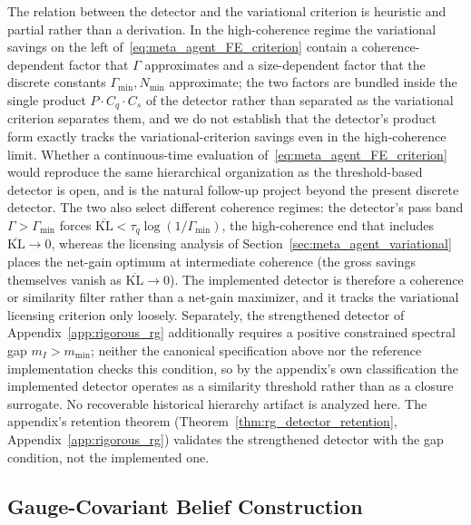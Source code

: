 \documentclass[11pt]{article}
\begin{document}
The relation between the detector and the variational criterion is heuristic and partial rather than a derivation. In the high-coherence regime the variational savings on the left of~\eqref{eq:meta_agent_FE_criterion} contain a coherence-dependent factor that $\Gamma$ approximates and a size-dependent factor that the discrete constants $\Gamma_{\min}, N_{\min}$ approximate; the two factors are bundled inside the single product $P \cdot C_q \cdot C_s$ of the detector rather than separated as the variational criterion separates them, and we do not establish that the detector's product form exactly tracks the variational-criterion savings even in the high-coherence limit. Whether a continuous-time evaluation of~\eqref{eq:meta_agent_FE_criterion} would reproduce the same hierarchical organization as the threshold-based detector is open, and is the natural follow-up project beyond the present discrete detector. The two also select different coherence regimes: the detector's pass band $\Gamma > \Gamma_{\min}$ forces $\overline{\mathrm{KL}} < \tau_q\log(1/\Gamma_{\min})$, the high-coherence end that includes $\overline{\mathrm{KL}} \to 0$, whereas the licensing analysis of Section~\ref{sec:meta_agent_variational} places the net-gain optimum at intermediate coherence (the gross savings themselves vanish as $\overline{\mathrm{KL}} \to 0$). The implemented detector is therefore a coherence or similarity filter rather than a net-gain maximizer, and it tracks the variational licensing criterion only loosely. Separately, the strengthened detector of Appendix~\ref{app:rigorous_rg} additionally requires a positive constrained spectral gap $m_I > m_{\min}$; neither the canonical specification above nor the reference implementation checks this condition, so by the appendix's own classification the implemented detector operates as a similarity threshold rather than as a closure surrogate. No recoverable historical hierarchy artifact is analyzed here. The appendix's retention theorem (Theorem~\ref{thm:rg_detector_retention}, Appendix~\ref{app:rigorous_rg}) validates the strengthened detector with the gap condition, not the implemented one.

\subsection{Gauge-Covariant Belief Construction}
\label{sec:meta_agent_state_construction}
\end{document}
